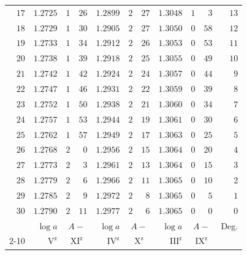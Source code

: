 \begin{center}
\begin{tabular}{r||r|rr||r|rr||r|rr||r}
$17$&$1.2725$&$1$&$26$&$1.2899$&$2$&$27$&$1.3048$&$1$&$3$&$13$\\
$18$&$1.2729$&$1$&$30$&$1.2905$&$2$&$27$&$1.3050$&$0$&$58$&$12$\\
$19$&$1.2733$&$1$&$34$&$1.2912$&$2$&$26$&$1.3053$&$0$&$53$&$11$\\
$20$&$1.2738$&$1$&$39$&$1.2918$&$2$&$25$&$1.3055$&$0$&$49$&$10$\\[3pt]
$21$&$1.2742$&$1$&$42$&$1.2924$&$2$&$24$&$1.3057$&$0$&$44$&$9$\\
$22$&$1.2747$&$1$&$46$&$1.2931$&$2$&$22$&$1.3059$&$0$&$39$&$8$\\
$23$&$1.2752$&$1$&$50$&$1.2938$&$2$&$21$&$1.3060$&$0$&$34$&$7$\\
$24$&$1.2757$&$1$&$53$&$1.2944$&$2$&$19$&$1.3061$&$0$&$30$&$6$\\
$25$&$1.2762$&$1$&$57$&$1.2949$&$2$&$17$&$1.3063$&$0$&$25$&$5$\\[3pt]
$26$&$1.2768$&$2$&$0$&$1.2956$&$2$&$15$&$1.3064$&$0$&$20$&$4$\\
$27$&$1.2773$&$2$&$3$&$1.2961$&$2$&$13$&$1.3064$&$0$&$15$&$3$\\
$28$&$1.2779$&$2$&$6$&$1.2966$&$2$&$11$&$1.3065$&$0$&$10$&$2$\\
$29$&$1.2785$&$2$&$9$&$1.2972$&$2$&$8$&$1.3065$&$0$&$5$&$1$\\
$30$&$1.2790$&$2$&$11$&$1.2977$&$2$&$6$&$1.3065$&$0$&$0$&$0$\\
\hline
&$\log a$&\multicolumn{2}{c||}{$A-$}&$\log a$&\multicolumn{2}{c||}{$A-$}&$\log a$&\multicolumn{2}{c||}{$A-$}&Deg.\\\cline{2-10}
&$\mathrm V^{\mathrm z}$&\multicolumn{2}{c||}{$\mathrm{XI}^{\mathrm z}$}&$\mathrm{IV}^{\mathrm z}$&\multicolumn{2}{c||}{$\mathrm X^{\mathrm z}$}&$\mathrm{III}^{\mathrm z}$&\multicolumn{2}{c||}{$\mathrm{IX}^{\mathrm z}$}&
\end{tabular}
\endgroup
\end{center}
\clearpage{}
